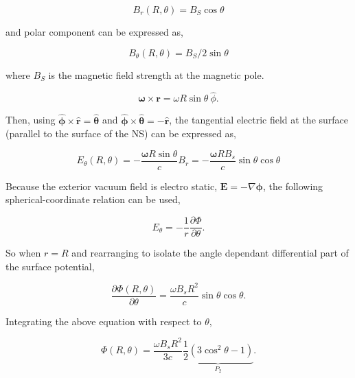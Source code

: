 \begin{equation}
    B_r (R, \theta) = B_S \cos \theta
\end{equation}

and polar component can be expressed as, 

\begin{equation}
    B_\theta (R, \theta) = B_S/2 \sin \theta
\end{equation}

where $B_S$ is the magnetic field strength at the magnetic pole.

\begin{equation}
    \boldsymbol{\omega} \times \textbf{r} = \omega R \sin \theta ~ \hat \phi. 
\end{equation}

Then, using $\hat{\boldsymbol{\phi}} \times \hat{\mathbf{r}} = \hat{\boldsymbol{\theta}}$ and $\hat{\boldsymbol{\phi}} \times \hat{\boldsymbol{\theta}} = -\hat{\mathbf{r}}$, the tangential electric field at the surface (parallel to the surface of the NS) can be expressed as, 

\begin{equation}
    E_\theta (R, \theta) = - \frac{\boldsymbol{\omega}R \sin \theta}{c} B_r = - \frac{\boldsymbol{\omega}R B_s}{c} \sin \theta \cos \theta 
\end{equation}

Because the exterior vacuum field is electro static, $\mathbf{E} = - \nabla \boldsymbol{\phi}$, the following spherical-coordinate relation can be used, 

\begin{equation}
    E_\theta = -\frac{1}{r} \frac{\partial{\Phi}}{\partial\theta}.
\end{equation}

So when $r=R$ and rearranging to isolate the angle dependant differential part of the surface potential, 

\begin{equation}
     \frac{\partial{\Phi} (R,\theta)}{\partial\theta} = \frac{\omega B_s R^2}{c} \sin \theta \cos \theta.
\end{equation}

Integrating the above equation with respect to $\theta$, 

\begin{equation}
     \Phi (R, \theta) =  \frac{\omega B_s R^2}{3c} \underbrace{\frac{1}{2}(3 \cos^2 \theta -1)}_{P_2}. 
     \label{eq:phiangledepfield}
\end{equation}

